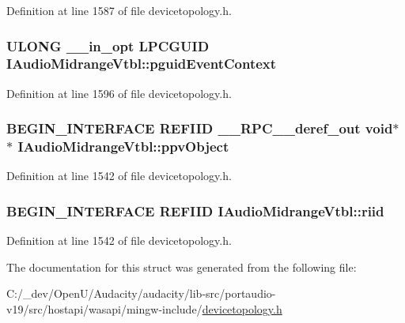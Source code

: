 Definition at line 1587 of file devicetopology.\+h.

\subsubsection[{\texorpdfstring{pguid\+Event\+Context}{pguidEventContext}}]{ {\bf U\+L\+O\+NG} {\bf \+\_\+\+\_\+in\+\_\+opt} {\bf L\+P\+C\+G\+U\+ID} I\+Audio\+Midrange\+Vtbl\+::pguid\+Event\+Context}\hypertarget{struct_i_audio_midrange_vtbl_ab0b10ee57bc0d511ac57684dc71a7061}{}\label{struct_i_audio_midrange_vtbl_ab0b10ee57bc0d511ac57684dc71a7061}


Definition at line 1596 of file devicetopology.\+h.

\subsubsection[{\texorpdfstring{ppv\+Object}{ppvObject}}]{\setlength{\rightskip}{0pt plus 5cm}B\+E\+G\+I\+N\+\_\+\+I\+N\+T\+E\+R\+F\+A\+CE {\bf R\+E\+F\+I\+ID} {\bf \+\_\+\+\_\+\+R\+P\+C\+\_\+\+\_\+deref\+\_\+out} {\bf void}$\ast$$\ast$ I\+Audio\+Midrange\+Vtbl\+::ppv\+Object}\hypertarget{struct_i_audio_midrange_vtbl_acd73bdd66898a770860001a0dfa153de}{}\label{struct_i_audio_midrange_vtbl_acd73bdd66898a770860001a0dfa153de}


Definition at line 1542 of file devicetopology.\+h.

\subsubsection[{\texorpdfstring{riid}{riid}}]{\setlength{\rightskip}{0pt plus 5cm}B\+E\+G\+I\+N\+\_\+\+I\+N\+T\+E\+R\+F\+A\+CE {\bf R\+E\+F\+I\+ID} I\+Audio\+Midrange\+Vtbl\+::riid}\hypertarget{struct_i_audio_midrange_vtbl_a8bed12d78dba93d5870f9a53554488c2}{}\label{struct_i_audio_midrange_vtbl_a8bed12d78dba93d5870f9a53554488c2}


Definition at line 1542 of file devicetopology.\+h.



The documentation for this struct was generated from the following file\+:\begin{DoxyCompactItemize}
\item 
C\+:/\+\_\+dev/\+Open\+U/\+Audacity/audacity/lib-\/src/portaudio-\/v19/src/hostapi/wasapi/mingw-\/include/\hyperlink{devicetopology_8h}{devicetopology.\+h}\end{DoxyCompactItemize}
